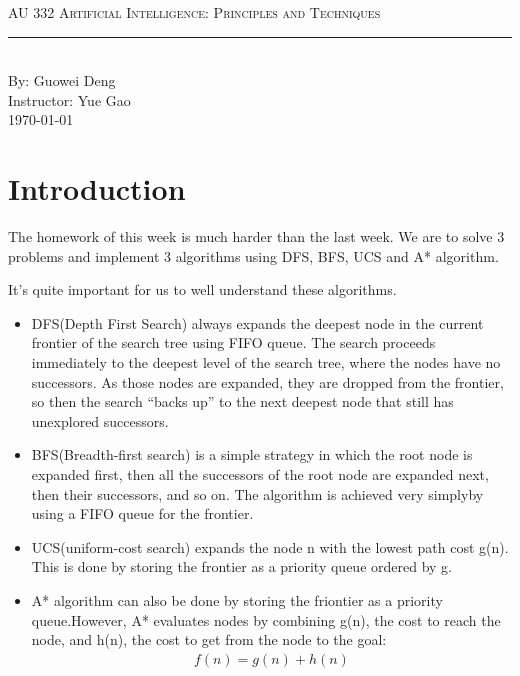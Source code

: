 \documentclass[aps,letterpaper,10pt]{revtex4}
\newcommand{\labtitle}{AU 332 Artificial Intelligence: Principles and Techniques}
\newcommand{\authorname}{Guowei Deng}
\newcommand{\professor}{Yue Gao}
\begin{document}
\begin{titlepage}
\begin{center}
{\Large \textsc{\labtitle} \\ \vspace{4pt}}
\rule[13pt]{\textwidth}{1pt} \\ \vspace{150pt}
{\large By: \authorname \\ \vspace{10pt}
Instructor: \professor \\ \vspace{10pt}
\today}
\end{center}
\end{titlepage}
\section{Introduction}
The homework of this week is much harder than the last week. We are to solve 3 problems and implement 3 algorithms using DFS, BFS, UCS and A* algorithm.\vspace{3mm}

It's quite important for us to well understand these algorithms.
\begin{itemize}
	\item DFS(Depth First Search) always expands the deepest node in the current frontier of the search tree using FIFO queue. The search proceeds immediately to the deepest level of the search tree, where the nodes have no successors. As those nodes are expanded, they are dropped from the frontier, so then the search “backs up” to the next deepest node that still has unexplored successors.
	\item BFS(Breadth-first search) is a simple strategy in which the root node is expanded first, then all the successors of the root node are expanded next, then their successors, and so on. The algorithm is achieved very simplyby using a FIFO queue for the frontier.
	\item UCS(uniform-cost search) expands the node n with the lowest path cost g(n). This is done by storing the frontier as a
priority queue ordered by g.
	\item A* algorithm can also be done by storing the friontier as a priority queue.However, A* evaluates nodes by combining g(n), the cost to reach the node, and h(n), the cost to get from the node to the goal:
\begin{align*}
f(n) = g(n) + h(n)
\end{align*}
\end{itemize}
\end{document}

